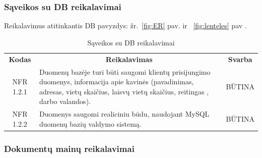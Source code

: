 \documentclass{VUMIFPSkursinis}
\begin{document}
\subsubsection{Sąveikos su DB reikalavimai}
Reikalavimus atitinkantis DB pavyzdys: žr.~\ref{fig:ER} pav. ir ~\ref{fig:lenteles} pav .
\begin{center}
	\begin{table}[H]
	\caption{Sąveikos su DB reikalavimai}
	\begin{tabular}{|p{2cm}|p{}|p{}|}
	\hline
	    \rowcolor{lightgray}
		\multicolumn{3}{|c|}{Sąveikos su DB reikalavimai}\\
		
	\hline
		\multicolumn{1}{|c|}{{\bfseries Kodas}}&
		\multicolumn{1}{|c|}{{\bfseries Reikalavimas}}&
		\multicolumn{1}{|c|}{{\bfseries Svarba}}\\
	\hline 	
		\multicolumn{1}{|c|}{NFR 1.2.1}&
		{Duomenų bazėje turi būti saugomi klientų prisijungimo duomenys, informacija apie kavinės (pavadinimas, adresas, vietų skaičius, laisvų vietų skaičius, reitingas , darbo valandos).}&
		\multicolumn{1}{|c|}{BŪTINA}\\	
	
	\hline 	
		\multicolumn{1}{|c|}{NFR 1.2.2}&
		{Duomenys saugomi realiciniu būdu, naudojant MySQL duomenų bazių valdymo sistemą.}&
		\multicolumn{1}{|c|}{BŪTINA}\\	
	
	\hline  	 	
	\end{tabular}
	
	\label{table:SąveikossuDBreikalavimai}
	\end{table}

\end{center}

\subsubsection{Dokumentų mainų reikalavimai}
\end{document}
